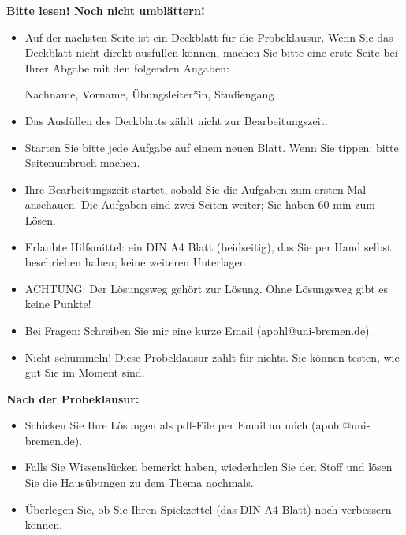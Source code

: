 \documentclass[12pt,a4paper]{scrartcl}%
\begin{document}
\thispagestyle{empty}

\begin{center}
 \textbf{\LARGE Bitte lesen! Noch nicht umbl\"attern!}
\end{center}

\begin{itemize}
\item Auf der n\"achsten Seite ist ein Deckblatt f\"ur die Probeklausur. Wenn Sie das Deckblatt nicht direkt ausf\"ullen k\"onnen, machen Sie bitte eine erste Seite bei Ihrer Abgabe mit den folgenden Angaben:
\begin{center}
 Nachname, Vorname, \"Ubungsleiter*in, Studiengang 
\end{center}
\item Das Ausf\"ullen des Deckblatts z\"ahlt nicht zur Bearbeitungszeit.
\item Starten Sie bitte jede Aufgabe auf einem neuen Blatt. Wenn Sie tippen: bitte Seitenumbruch machen.
\item Ihre Bearbeitungszeit startet, sobald Sie die Aufgaben zum ersten Mal anschauen. Die Aufgaben sind zwei Seiten weiter; Sie haben 60 min zum L\"osen.
\item Erlaubte Hilfsmittel: ein DIN A4 Blatt (beidseitig), das Sie per Hand selbst beschrieben haben; keine weiteren Unterlagen
\item ACHTUNG: Der L\"osungsweg geh\"ort zur L\"osung. Ohne L\"osungsweg gibt es keine Punkte!
\item Bei Fragen: Schreiben Sie mir eine kurze Email (apohl@uni-bremen.de). 
\item Nicht schummeln! Diese Probeklausur z\"ahlt f\"ur nichts. Sie k\"onnen testen, wie gut Sie im Moment sind.
\end{itemize}

\bigskip

\textbf{Nach der Probeklausur:}
\begin{itemize}
\item Schicken Sie Ihre L\"osungen als pdf-File per Email an mich (apohl@uni-bremen.de).
\item Falls Sie Wissensl\"ucken bemerkt haben, wiederholen Sie den Stoff und l\"osen Sie die Haus\"ubungen zu dem Thema nochmals.
\item \"Uberlegen Sie, ob Sie Ihren \glqq Spickzettel\grqq{} (das DIN A4 Blatt)  noch verbessern k\"onnen.
\end{itemize}
\end{document}
